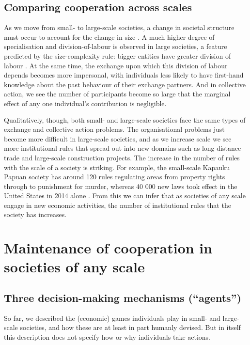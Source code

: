 \documentclass[10pt, a4paper, fleqn]{article}
\begin{document}
\subsection*{Comparing cooperation across scales}

As we move from small- to large-scale societies, a change in societal structure must occur to account for the change in size \citep{Bonner:2011:a}. A much higher degree of specialisation and division-of-labour is observed in large societies, a feature predicted by the size-complexity rule: bigger entities have greater division of labour \citep{Bonner:2004:a,Bourke:2011:a}. At the same time, the exchange upon which this division of labour depends becomes more impersonal, with individuals less likely to have first-hand knowledge about the past behaviour of their exchange partners. And in collective action, we see the number of participants become so large that the marginal effect of any one individual's contribution is negligible. 

Qualitatively, though, both small- and large-scale societies face the same types of exchange and collective action problems. The organisational problems just become more difficult in large-scale societies, and as we increase scale we see more institutional rules that spread out into new domains such as long distance trade and large-scale construction projects. The increase in the number of rules with the scale of a society is striking. For example, the small-scale Kapauku Papuan society has around 120 rules regulating areas from property rights through to punishment for murder, whereas 40 000 new laws took effect in the United States in 2014 alone \citep{Singh:2017:a}. From this we can infer that as societies of any scale engage in new economic activities, the number of institutional rules that the society has increases.

\section*{Maintenance of cooperation in societies of any scale}

\subsection*{Three decision-making mechanisms (``agents'')}
So far, we described the (economic) games individuals play in small- and large-scale societies, and how these are at least in part humanly devised. But in itself this description does not specify how or why individuals take actions.
\end{document}
